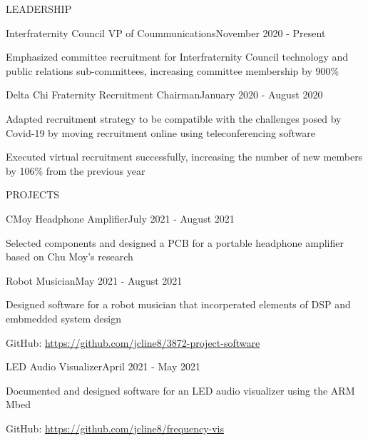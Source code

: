 \documentclass{resume}
\begin{document}
\begin{rSection}{LEADERSHIP}
	\begin{rSubsection}{Interfraternity Council VP of Coummunications}{November 2020 - Present}{}{}{}
		\item Emphasized committee recruitment for Interfraternity Council technology and public relations sub-committees, increasing committee membership by 900\%
	\end{rSubsection}
	\begin{rSubsection}{Delta Chi Fraternity Recruitment Chairman}{January 2020 - August 2020}{}{}{}
		\item Adapted recruitment strategy to be compatible with the challenges posed by Covid-19 by moving recruitment online using teleconferencing software
		\item Executed virtual recruitment successfully, increasing the number of new members by 106\% from the previous year
	\end{rSubsection}
\end{rSection}
\begin{rSection}{PROJECTS}
	\begin{rSubsection}{CMoy Headphone Amplifier}{July 2021 - August 2021}{}{}{}
		\item Selected components and designed a PCB for a portable headphone amplifier based on Chu Moy's research
	\end{rSubsection}
	\begin{rSubsection}{Robot Musician}{May 2021 - August 2021}{}{}{}
		\item Designed software for a robot musician that incorperated elements of DSP and embmedded system design
		\item GitHub: \url{https://github.com/jcline8/3872-project-software}
	\end{rSubsection}
	\begin{rSubsection}{LED Audio Visualizer}{April 2021 - May 2021}{}{}{}
		\item Documented and designed software for an LED audio visualizer using the ARM Mbed
		\item GitHub: \url{https://github.com/jcline8/frequency-vis}
	\end{rSubsection}
\end{rSection}
\end{document}
